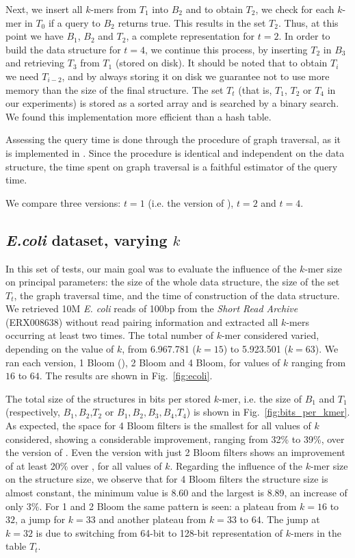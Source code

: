 \documentclass[pdftex]{llncs}\usepackage[T1]{fontenc}
\begin{document}
Next, we insert all $k$-mers from $T_1$ into $B_2$ and to
obtain $T_2$, we check for each $k$-mer in $T_0$ if a query to $B_2$
returns true. This results in the set $T_2$. Thus, 
at this point we have $B_1$, $B_2$ and $T_2$, a complete
representation for $t = 2$. In order to build the data structure for $t = 4$, we continue this
process, by inserting $T_2$ in $B_3$ and retrieving $T_3$ from $T_1$
(stored on disk). It should be noted that to obtain $T_i$
we need $T_{i-2}$, and by always storing it on disk we guarantee
not to use more memory than the size of the final structure. 
The set $T_t$ (that is, $T_1$, $T_2$ or $T_4$ in our experiments)
is stored as a sorted array and is searched by a binary search. We
found this implementation more efficient than a hash table. 

Assessing the query time is done through the procedure of graph
traversal, as it is implemented in
\cite{DBLP:conf/wabi/ChikhiR12}. Since the procedure is identical and
independent on the data structure, the time spent on graph traversal
is a faithful estimator of the query time. 

We compare three versions: $t=1$ (i.e. the version of
\cite{DBLP:conf/wabi/ChikhiR12}), $t=2$ and $t=4$. 

\subsection{\emph{E.coli} dataset, varying $k$}
In this set of tests, our main goal was to evaluate the influence of
the $k$-mer size on principal parameters:  the size of
the whole data structure, the size of the set $T_t$, the graph
traversal time, and the time of construction of the data structure. 
We retrieved 10M \emph{E. coli} reads of 100bp
from the \emph{Short Read Archive} (ERX008638) without read pairing
information and 
extracted all $k$-mers occurring at least two times. The total number
of $k$-mer considered varied, depending on the value of $k$, from
6.967.781 ($k=15$) to 5.923.501 ($k = 63$).  We ran each version, 1
Bloom (\cite{DBLP:conf/wabi/ChikhiR12}), 2 Bloom and 4 Bloom, for
values of $k$ ranging from $16$ to $64$. The results are shown in
Fig.~\ref{fig:ecoli}.

The total size of the structures in bits per stored $k$-mer, i.e. the size of
$B_1$ and $T_1$ (respectively, $B_1, B_2$,$T_2$ or $B_1, B_2, B_3,
B_4$,$T_4$)
is shown in
Fig.~\ref{fig:bits_per_kmer}. As expected, the space for 4 Bloom
filters is the smallest for all values of $k$ considered, showing a
considerable improvement, ranging from 32\% to 39\%, over
the version of \cite{DBLP:conf/wabi/ChikhiR12}. Even the version with
just 2 Bloom filters shows
an improvement of at least 20\% over \cite{DBLP:conf/wabi/ChikhiR12}, for all
values of $k$. Regarding the influence of the $k$-mer size on the
structure size, we observe that for 4 Bloom filters the structure size
is almost constant, the minimum value is 8.60 and the largest is 8.89,
an increase of only 3\%. For 1 and 2 Bloom the same pattern is seen: a
plateau from $k = 16$ to $32$, a jump for $k=33$ and another plateau
from $k = 33$ to $64$. The jump at $k=32$ is due to switching from
64-bit to 128-bit representation of $k$-mers in the table $T_t$. 
\end{document}

